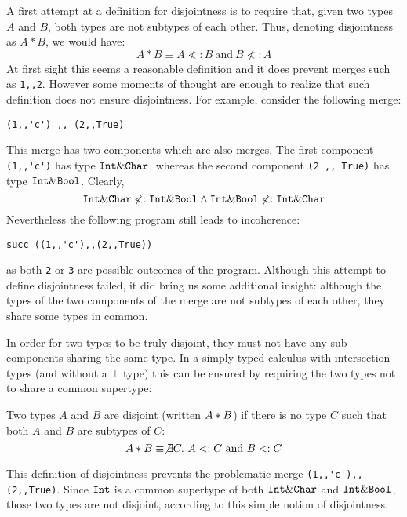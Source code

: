A first attempt at a definition for disjointness is to require that,
given two types $A$ and $B$, both types are not subtypes of each
other. Thus, denoting disjointness as $A * B$, we would have:
\[A * B \equiv A \not<: B~\text{and}~B \not<: A\]
At first sight this seems a reasonable definition and it does prevent
merges such as \lstinline{1,,2}. However some moments of thought are enough to realize that
such definition does not ensure disjointness. For example, consider
the following merge:

\begin{lstlisting}
(1,,'c') ,, (2,,True)
\end{lstlisting}

\noindent This merge has two components which are also merges. 
The first component \lstinline{(1,,'c')} has type $\texttt{Int} \&
\texttt{Char}$, whereas the second component \lstinline{(2 ,, True)} has type
$\texttt{Int} \& \texttt{Bool}$. Clearly,
\[ \texttt{Int} \& \texttt{Char} \not <: \texttt{Int} \& \texttt{Bool} \wedge \texttt{Int} \& \texttt{Bool} \not <: \texttt{Int} \& \texttt{Char} \]
Nevertheless the following program still leads to
incoherence:
\begin{lstlisting}
succ ((1,,'c'),,(2,,True))
\end{lstlisting}
as both \lstinline{2} or \lstinline{3} are possible outcomes
of the program. Although this attempt to define disjointness failed,
it did bring us some additional insight: although the types of the two
components of the merge are not subtypes of each other, they share
some types in common.

In order for two types to be truly disjoint, they must not have any
sub-components sharing the same type. In a simply typed calculus with intersection
types (and without a $\top$ type) this can be ensured by requiring the two types 
not to share a common supertype: 

\begin{definition}
  Two types $A$ and $B$ are disjoint
  (written $A * B$) if there is no type $C$ such that both $A$ and $B$ are
  subtypes of $C$:
  \[A * B \equiv \not\exists C.~A <: C~\text{and}~B<: C\]
\end{definition}\label{def:simple_dis}

\noindent This definition of disjointness prevents the problematic merge
\lstinline$(1,,'c'),,(2,,True)$. Since $\texttt{Int}$ is a
common supertype of both $\texttt{Int} \& \texttt{Char}$ and $\texttt{Int}
\& \texttt{Bool}$, those two types are not disjoint, according to this
simple notion of disjointness.

